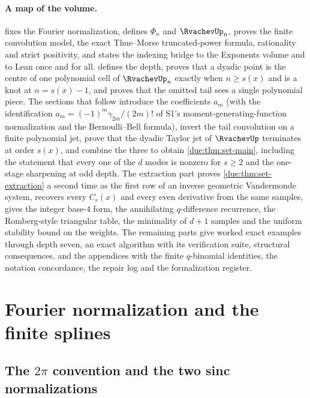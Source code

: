 \documentclass[11pt,oneside]{article}
\theoremstyle{plain}
\theoremstyle{definition}
\theoremstyle{remark}
\newcommand{\upn}[1]{\RvachevUp_{#1}}
\newcommand{\Phin}[1]{\Phi_{#1}}                            %
\newcommand{\dep}[1]{s\!\left(#1\right)}                    %
\newcommand{\am}[1]{a_{#1}}                                 %
\newcommand{\Cr}[2]{C_{#1}\!\left(#2\right)}                %
\begin{document}
\paragraph{A map of the volume.}
 fixes the Fourier normalization, defines
$\Phin{n}$ and $\upn{n}$, proves the finite convolution model, the exact
Thue--Morse truncated-power formula, rationality and strict positivity,
and states the indexing bridge to the Exponents volume and to Lean once
and for all.   defines the depth, proves that a dyadic
point is the centre of one polynomial cell of $\upn{n}$ exactly when
$n\ge\dep{x}$ and is a knot at $n=\dep{x}-1$, and proves that the omitted
tail sees a single polynomial piece.  The sections that follow introduce
the coefficients $\am{m}$ (with the identification
$\am{m}=(-1)^{m}\gamma_{2m}/(2m)!$ of S1's moment-generating-function
normalization and the Bernoulli--Bell formula), invert the tail
convolution on a finite polynomial jet, prove that the dyadic Taylor jet
of $\RvachevUp$ terminates at order $\dep{x}$, and combine the three to
obtain \cref{due:thm:set-main}, including the statement that every one of
the $d$ modes is nonzero for $s\ge2$ and the one-stage sharpening at odd
depth.  The extraction part proves \cref{due:thm:set-extraction} a second
time as the first row of an inverse geometric Vandermonde system,
recovers every $\Cr{r}{x}$ and every even derivative from the same
samples, gives the integer base-$4$ form, the annihilating $q$-difference
recurrence, the Romberg-style triangular table, the minimality of $d+1$
samples and the uniform stability bound on the weights.  The remaining
parts give worked exact examples through depth seven, an exact algorithm
with its verification suite, structural consequences, and the appendices
with the finite $q$-binomial identities, the notation concordance, the
repair log and the formalization register.

\section{Fourier normalization and the finite splines}
\label{due:sec:setting}

\subsection{The \texorpdfstring{$2\pi$}{2pi} convention and the two sinc normalizations}
\label{due:sec:set-fourier}
\end{document}
